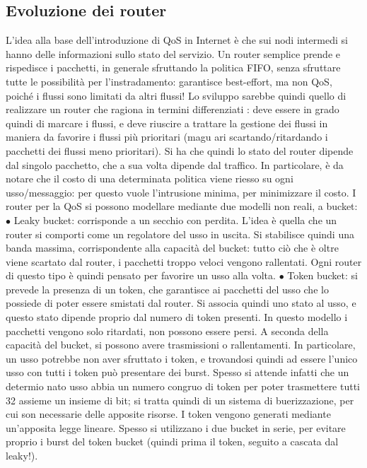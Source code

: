 \subsection{Evoluzione dei router}
L'idea alla base dell'introduzione di QoS in Internet è che sui nodi intermedi si
hanno delle informazioni sullo stato del servizio. Un router semplice prende e
rispedisce i pacchetti, in generale sfruttando la politica FIFO, senza sfruttare
tutte le possibilità per l'instradamento: garantisce best-effort, ma non QoS,
poiché i flussi sono limitati da altri flussi!
Lo sviluppo sarebbe quindi quello di realizzare un router che ragiona in termini differenziati : deve essere in grado
quindi di marcare i flussi, e deve riuscire
a trattare la gestione dei flussi in maniera da favorire i flussi più prioritari (magu
ari scartando/ritardando i pacchetti dei flussi meno prioritari). Si ha che quindi
lo stato del router dipende dal singolo pacchetto, che a sua volta dipende dal
traffico. In particolare, è da notare che il costo di una determinata politica
viene riesso su ogni usso/messaggio: per questo vuole l'intrusione minima,
per minimizzare il costo.
I router per la QoS si possono modellare mediante due modelli non reali, a
bucket:
$\bullet$ Leaky bucket: corrisponde a un secchio con perdita. L'idea è quella che
un router si comporti come un regolatore del usso in uscita. Si stabilisce
quindi una banda massima, corrispondente alla capacità del bucket: tutto
ciò che è oltre viene scartato dal router, i pacchetti troppo veloci vengono
rallentati. Ogni router di questo tipo è quindi pensato per favorire un
usso alla volta.
$\bullet$ Token bucket: si prevede la presenza di un token, che garantisce ai pacchetti del usso che lo possiede di
poter essere smistati dal router. Si associa
quindi uno stato al usso, e questo stato dipende proprio dal numero di
token presenti. In questo modello i pacchetti vengono solo ritardati, non
possono essere persi. A seconda della capacità del bucket, si possono avere
trasmissioni o rallentamenti. In particolare, un usso potrebbe non aver
sfruttato i token, e trovandosi quindi ad essere l'unico usso con tutti i
token può presentare dei burst. Spesso si attende infatti che un determio
nato usso abbia un numero congruo di token per poter trasmettere tutti
32
assieme un insieme di bit; si tratta quindi di un sistema di buerizzazione,
per cui son necessarie delle apposite risorse. I token vengono generati
mediante un'apposita legge lineare.
Spesso si utilizzano i due bucket in serie, per evitare proprio i burst del token
bucket (quindi prima il token, seguito a cascata dal leaky!).
